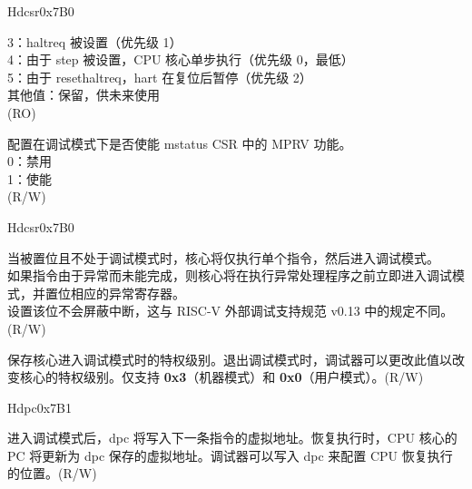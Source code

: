 \begin{register}{H}{dcsr}{0x7B0}
\begin{regdesc}
\begin{reglist}
3：haltreq 被设置（优先级 1）\\
4：由于 step 被设置，CPU 核心单步执行（优先级 0，最低）\\
5：由于 resethaltreq，hart 在复位后暂停（优先级 2）\\
其他值：保留，供未来使用\\
(RO)
\label{fielddesc:DCSRMPRVEN}\item [mprven] 配置在调试模式下是否使能 mstatus CSR 中的 MPRV 功能。\\
0：禁用 \\
1：使能\\
(R/W)
\item [见下页……]
\end{reglist}\end{regdesc}
\end{register}
\addtocounter{Regfloat}{-1}
\begin{register}{H}{dcsr}{0x7B0}
\begin{regdesc}\begin{reglist}
\item [接上页……]
\label{fielddesc:DCSRSTEP}\item [step] 当被置位且不处于调试模式时，核心将仅执行单个指令，然后进入调试模式。 \\
如果指令由于异常而未能完成，则核心将在执行异常处理程序之前立即进入调试模式，并置位相应的异常寄存器。\\
设置该位不会屏蔽中断，这与 RISC-V 外部调试支持规范 v0.13 中的规定不同。\\
(R/W)
\label{fielddesc:DCSRPRV}\item [prv] 保存核心进入调试模式时的特权级别。退出调试模式时，调试器可以更改此值以改变核心的特权级别。仅支持 \textbf{0x3}（机器模式）和 \textbf{0x0}（用户模式）。(R/W)
\end{reglist}
\end{regdesc}
\end{register}

\begin{register}{H}{dpc}{0x7B1}
\label{regdesc:DPC}
%
\regnewline%
\begin{regdesc}
\begin{reglist}
\label{fielddesc:DPC}\item [dpc] 进入调试模式后，dpc 将写入下一条指令的虚拟地址。恢复执行时，CPU 核心的 PC 将更新为 dpc 保存的虚拟地址。调试器可以写入 dpc 来配置 CPU 恢复执行的位置。(R/W)
\end{reglist}
\end{regdesc}
\end{register}

